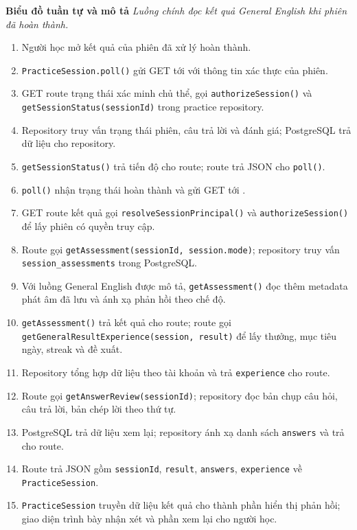 \documentclass[12pt,a4paper,oneside]{report}
\begin{document}
\noindent\textbf{Biểu đồ tuần tự và mô tả}
\noindent\textit{Luồng chính đọc kết quả General English khi phiên đã hoàn thành.}
\begin{enumerate}
    \item Người học mở kết quả của phiên đã xử lý hoàn thành.
    \item \texttt{PracticeSession.poll()} gửi GET tới  với thông tin xác thực của phiên.
    \item GET route trạng thái xác minh chủ thể, gọi \texttt{authorizeSession()} và \texttt{getSessionStatus(sessionId)} trong practice repository.
    \item Repository truy vấn trạng thái phiên, câu trả lời và đánh giá; PostgreSQL trả dữ liệu cho repository.
    \item \texttt{getSessionStatus()} trả tiến độ cho route; route trả JSON cho \texttt{poll()}.
    \item \texttt{poll()} nhận trạng thái hoàn thành và gửi GET tới .
    \item GET route kết quả gọi \texttt{resolveSessionPrincipal()} và \texttt{authorizeSession()} để lấy phiên có quyền truy cập.
    \item Route gọi \texttt{getAssessment(sessionId, session.mode)}; repository truy vấn \texttt{session\_assessments} trong PostgreSQL.
    \item Với luồng General English được mô tả, \texttt{getAssessment()} đọc thêm metadata phát âm đã lưu và ánh xạ phản hồi theo chế độ.
    \item \texttt{getAssessment()} trả kết quả cho route; route gọi \texttt{getGeneralResultExperience(session, result)} để lấy thưởng, mục tiêu ngày, streak và đề xuất.
    \item Repository tổng hợp dữ liệu theo tài khoản và trả \texttt{experience} cho route.
    \item Route gọi \texttt{getAnswerReview(sessionId)}; repository đọc bản chụp câu hỏi, câu trả lời, bản chép lời theo thứ tự.
    \item PostgreSQL trả dữ liệu xem lại; repository ánh xạ danh sách \texttt{answers} và trả cho route.
    \item Route trả JSON gồm \texttt{sessionId}, \texttt{result}, \texttt{answers}, \texttt{experience} về \texttt{PracticeSession}.
    \item \texttt{PracticeSession} truyền dữ liệu kết quả cho thành phần hiển thị phản hồi; giao diện trình bày nhận xét và phần xem lại cho người học.
\end{enumerate}
\end{document}
